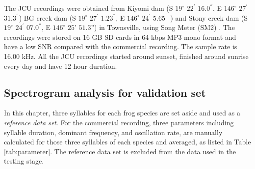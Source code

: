 The JCU recordings were obtained from Kiyomi dam (S $19^{\circ}$ $22^{'}$ $16.0^{''}$, E $146^{\circ}$ $27^{'}$ $31.3^{''}$)  BG creek dam (S $19^{\circ}$ $27^{'}$ $1.23^{''}$, E $146^{\circ}$ $24^{'}$ $5.65^{''}$ ) and Stony creek dam (S $19^{\circ}$ $24^{'}$ $07.0^{''}$, E $146^{\circ}$ $25’$ $51.3”$) in Townsville, using Song Meter (SM2) \citep{songMeter}. The recordings were stored on 16 GB SD cards in 64 kbps MP3 mono format and have a low SNR compared with the commercial recording. The sample rate is 16.00 kHz.
All the JCU recordings started around sunset, finished around sunrise every day and have 12 hour duration. 






\subsection{Spectrogram analysis for validation set}
In this chapter, three syllables for each frog species are set aside and used as a \textit{reference data set}. For the commercial recording, three parameters including syllable duration, dominant frequency, and oscillation rate, are manually calculated for those three syllables of each species and averaged, as listed in Table \ref{tab:parameter}. The reference data set is excluded from the data used in the testing stage. 

